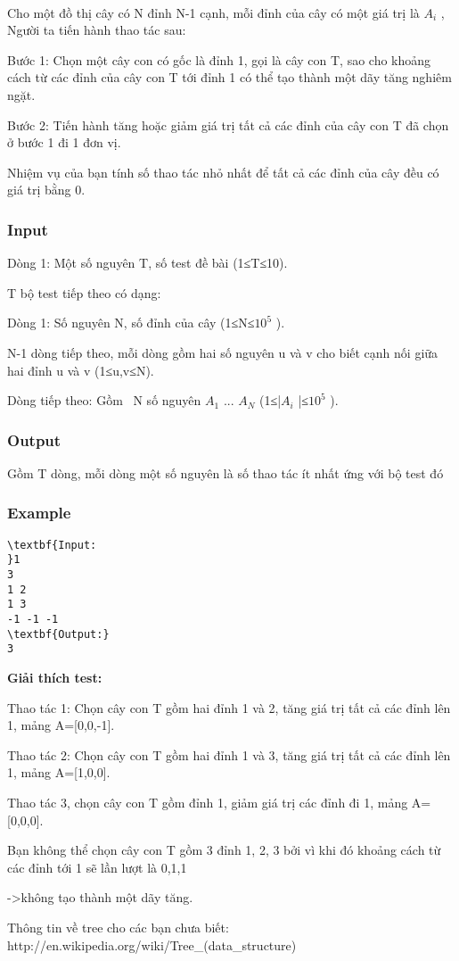 

 

Cho một đồ thị cây có N đỉnh N-1 cạnh, mỗi đỉnh của cây có một giá trị là $A_{i}$ , Người ta tiến hành thao tác sau:

Bước 1: Chọn một cây con có gốc là đỉnh 1, gọi là cây con T, sao cho khoảng cách từ các đỉnh của cây con T tới đỉnh 1 có thể tạo thành một dãy tăng nghiêm ngặt.

Bước 2: Tiến hành tăng hoặc giảm giá trị tất cả các đỉnh của cây con T đã chọn ở bước 1 đi 1 đơn vị.

Nhiệm vụ của bạn tính số thao tác nhỏ nhất để tất cả các đỉnh của cây đều có giá trị bằng 0.

\subsubsection{Input}

Dòng 1: Một số nguyên T, số test đề bài (1≤T≤10).

T bộ test tiếp theo có dạng:

Dòng 1: Số nguyên N, số đỉnh của cây (1≤N≤$10^{5}$ ).

N-1 dòng tiếp theo, mỗi dòng gồm hai số nguyên u và v cho biết cạnh nối giữa hai đỉnh u và v (1≤u,v≤N).

Dòng tiếp theo: Gồm  N số nguyên $A_{1}$ ... $A_{N}$ (1≤|$A_{i}$ |≤$10^{5}$ ).

\subsubsection{Output}

Gồm T dòng, mỗi dòng một số nguyên là số thao tác ít nhất ứng với bộ test đó

\subsubsection{Example}
\begin{verbatim}
\textbf{Input:
}1
3
1 2
1 3
-1 -1 -1
\textbf{Output:}
3
\end{verbatim}

\textbf{Giải thích test:}

Thao tác 1: Chọn cây con T gồm hai đỉnh 1 và 2, tăng giá trị tất cả các đỉnh lên 1, mảng A=[0,0,-1].

Thao tác 2: Chọn cây con T gồm hai đỉnh 1 và 3, tăng giá trị tất cả các đỉnh lên 1, mảng A=[1,0,0].

Thao tác 3, chọn cây con T gồm đỉnh 1, giảm giá trị các đỉnh đi 1, mảng A=[0,0,0].

Bạn không thể chọn cây con T gồm 3 đỉnh 1, 2, 3 bởi vì khi đó khoảng cách từ các đỉnh tới 1 sẽ lần lượt là 0,1,1

->không tạo thành một dãy tăng.

Thông tin về tree cho các bạn chưa biết: http://en.wikipedia.org/wiki/Tree\_(data\_structure)
